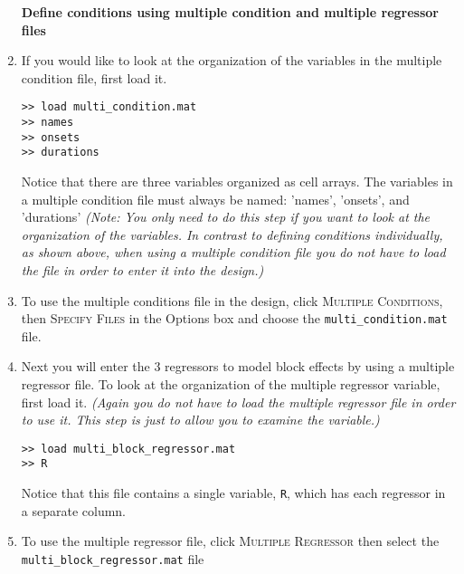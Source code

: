 \begin{enumerate}
\textbf{Define conditions using multiple condition and multiple regressor files}\\
\item If you would like to look at the organization of the variables in the multiple condition file, first load it.
\begin{verbatim}
>> load multi_condition.mat
>> names
>> onsets
>> durations
\end{verbatim}
Notice that there are three variables organized as cell arrays. The variables in a multiple condition file must always be named: 'names', 'onsets', and 'durations'
\textit{(Note: You only need to do this step if you want to look at the organization of the variables. In contrast to defining conditions individually, as shown above, when using a multiple condition file you do not have to load the file in order to enter it into the design.)}\\
\item To use the multiple conditions file in the design, click \textsc{Multiple Conditions}, then \textsc{Specify Files} in the Options box and choose the \texttt{multi\_condition.mat} file.
\item Next you will enter the 3 regressors to model block effects by using a multiple regressor file. To look at the organization of the multiple regressor variable, first load it. \textit{(Again you do not have to load the multiple regressor file in order to use it. This step is just to allow you to examine the variable.)}
\begin{verbatim}
>> load multi_block_regressor.mat
>> R
\end{verbatim}
Notice that this file contains a single variable, \texttt{R}, which has each regressor in a separate column.
\item To use the multiple regressor file, click \textsc{Multiple Regressor} then select the  \texttt{multi\_block\_regressor.mat} file\\\\


\end{enumerate}
